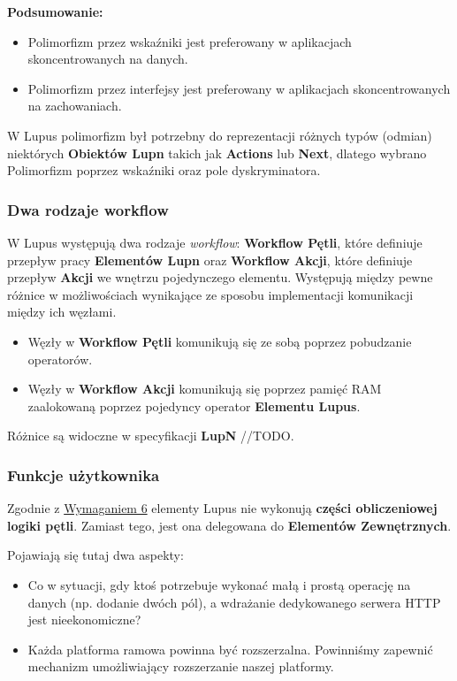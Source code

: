 \textbf{Podsumowanie:}

\begin{itemize}
    \item Polimorfizm przez wskaźniki jest preferowany w aplikacjach skoncentrowanych na danych.
    \item Polimorfizm przez interfejsy jest preferowany w aplikacjach skoncentrowanych na zachowaniach.
\end{itemize}

W Lupus polimorfizm był potrzebny do reprezentacji różnych typów (odmian) niektórych \textbf{Obiektów Lupn} takich jak \textbf{Actions} lub \textbf{Next}, dlatego wybrano Polimorfizm poprzez wskaźniki oraz pole dyskryminatora.

\subsubsection{Dwa rodzaje workflow}

W Lupus występują dwa rodzaje \textit{workflow}: \textbf{Workflow Pętli}, które definiuje przepływ pracy \textbf{Elementów Lupn} oraz \textbf{Workflow Akcji}, które definiuje przepływ \textbf{Akcji} we wnętrzu pojedynczego elementu. Występują między pewne różnice w możliwościach wynikające ze sposobu implementacji komunikacji między ich węzłami.

\begin{itemize}
    \item Węzły w \textbf{Workflow Pętli} komunikują się ze sobą poprzez pobudzanie operatorów.
    \item Węzły w \textbf{Workflow Akcji} komunikują się poprzez pamięć RAM zaalokowaną poprzez pojedyncy operator \textbf{Elementu Lupus}.
\end{itemize}

Różnice są widoczne w specyfikacji \textbf{LupN} //TODO.

\subsubsection{Funkcje użytkownika}\label{sec:funkcje-uzytkownika}
Zgodnie z \hyperref[req:6]{Wymaganiem 6} elementy Lupus nie wykonują \textbf{części obliczeniowej logiki pętli}.  Zamiast tego, jest ona delegowana do \textbf{Elementów Zewnętrznych}.

Pojawiają się tutaj dwa aspekty:
\begin{itemize}
    \item Co w sytuacji, gdy ktoś potrzebuje wykonać małą i prostą operację na danych (np. dodanie dwóch pól), a wdrażanie dedykowanego serwera HTTP jest nieekonomiczne?
    \item Każda platforma ramowa powinna być rozszerzalna. Powinniśmy zapewnić mechanizm umożliwiający rozszerzanie naszej platformy.
\end{itemize}

